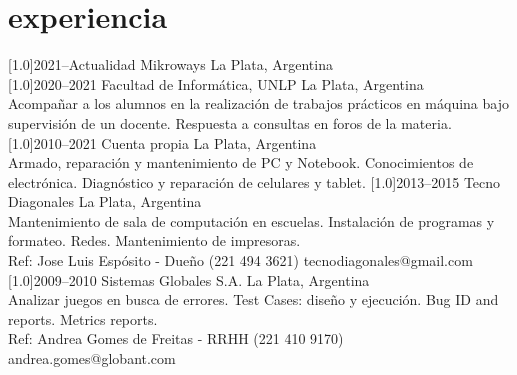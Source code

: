 \documentclass[espanol]{cv-style}     %
\begin{document}
\section{experiencia}
  \vspace{-0.3cm}
\begin{entrylist}
\entry
  {\scalebox{.8}[1.0]{2021--Actualidad}}
  {Mikroways}
  {La Plata, Argentina}
  {\\
   }
\entry
  {\scalebox{.8}[1.0]{2020--2021}}
  {Facultad de Informática, UNLP}
  {La Plata, Argentina}
  {\\
   Acompañar a los alumnos en la realización de trabajos prácticos en máquina
bajo supervisión de un docente. Respuesta a consultas en foros de la materia.}
\entry
  {\scalebox{.8}[1.0]{2010--2021}}
  {Cuenta propia}
  {La Plata, Argentina}
  {\\
   Armado, reparación y mantenimiento de PC y Notebook. Conocimientos de electrónica. Diagnóstico y reparación de celulares y tablet.}
\entry
  {\scalebox{.8}[1.0]{2013--2015}}
  {Tecno Diagonales}
  {La Plata, Argentina}
  {\\
  Mantenimiento de sala de computación en escuelas. Instalación de programas y formateo. Redes. Mantenimiento de impresoras.\\
  \small{Ref: Jose Luis Espósito - Dueño (221 494 3621) tecnodiagonales@gmail.com}}
\entry
  {\scalebox{.8}[1.0]{2009--2010}}
  {Sistemas Globales S.A.}
  {La Plata, Argentina}
  {\\
  Analizar juegos en busca de errores. Test Cases: diseño y ejecución. Bug ID and reports. Metrics reports.\\
  \small{Ref: Andrea Gomes de Freitas - RRHH (221 410 9170) andrea.gomes@globant.com}}
\end{entrylist}
\vspace{-0.4cm}
\end{document}
